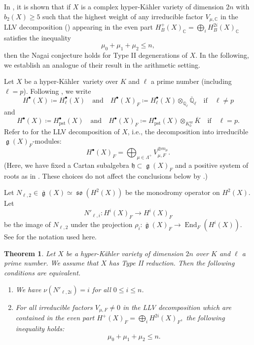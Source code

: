 \documentclass[12pt,reqno]{amsart}
\newtheorem{thm}{Theorem}[section]
\theoremstyle{definition}
\newcommand{\Q}{{\mathds Q}}
\newcommand{\C}{{\mathds C}}
\newcommand\End{\mathop{\mathrm{End}}\nolimits}
\renewcommand\ge{\mathop{\mathfrak{g}}\nolimits}
\newcommand\so{\mathop{\mathfrak{so}}\nolimits}
\newcommand{\hk}{hyper-Kähler~}
\newcommand{\frh}{\mathfrak{h}}
\DeclareMathOperator{\pst}{pst}
\numberwithin{equation}{section}
\begin{document}
In \cite[Theorem 5.2]{GKLR}, it is shown that if $X$ is a complex hyper-Kähler variety of dimension $2n$ with $b_2(X) \geq 5$ such that the highest weight of any irreducible factor $V_{\mu, \C}$ in the LLV decomposition () appearing in the even part $H^+_B(X)_\C=\bigoplus_i H^{2i}_B(X)_\C$
satisfies
the inequality 
\[
\mu_0 + \mu_1 + \mu_2 \leq n,
\]
then the Nagai conjecture holds for Type II degenerations of $X$.
In the following, we establish an analogue of their result in the arithmetic setting.

Let $X$ be a \hk variety over $K$ and $\ell$ a prime number (including $\ell=p$).
Following ,
we write
\[
H^\bullet(X) \coloneqq  H^\bullet_\ell(X) \quad \text{and} \quad H^\bullet(X)_F\coloneqq  H^\bullet_\ell(X) \otimes_{\Q_\ell} \overline{\Q}_\ell \quad \text{if} \quad \ell \neq p
\]
and 
\[
H^\bullet(X) \coloneqq  H^\bullet_{\pst}(X) \quad \text{and} \quad H^\bullet(X)_F\coloneqq  H^\bullet_{\pst}(X)\otimes_{K_{0}^{\mathrm{ur}}} \overline{K} \quad \text{if} \quad \ell = p.
\]
Refer to  for the LLV decomposition of $X$, i.e., the decomposition into irreducible $\ge(X)_F$-modules:
\[
H^\bullet(X)_F = \bigoplus_{\mu \in \Lambda^+} V_{\mu, F}^{\oplus m_{\mu}}.
\]
(Here, we have fixed a Cartan subalgebra $\frh \subset \ge(X)_F$ and a positive system of roots as in .
    These choices do not affect the conclusions below by .)




Let $N_{\ell, 2} \in \overline{\ge}(X) \simeq \so(H^2(X))$ be the monodromy operator on $H^2(X)$.
Let
\[
N'_{\ell, i} \colon H^i(X)_F \to H^i(X)_F
\]
be the image of
$N_{\ell, 2}$ under the projection
$\rho_i \colon \overline{\ge}(X)_F \to \End_F(H^i(X))$.
See  for the notation used here.


\begin{thm}\label{thm:arithmeticGreenKimetc}
    Let $X$ be a hyper-Kähler variety of dimension $2n$ over $K$ and $\ell$ a prime number.
    We assume that $X$ has Type II reduction.
    Then the following conditions are equivalent.
    \begin{enumerate}
        \item We have $\nu(N'_{\ell, 2i}) =i$ for all $0 \leq i \leq n$.
        \item For all irreducible factors $V_{\mu, F} \neq 0$ in the LLV decomposition which are contained in the even part
        $
        H^+(X)_F=\bigoplus_i H^{2i}(X)_F,
        $
        the following inequality holds:
        \[
	\mu_0 + \mu_1 + \mu_2 \leq n.
\]
    \end{enumerate}
\end{thm}
\end{document}
